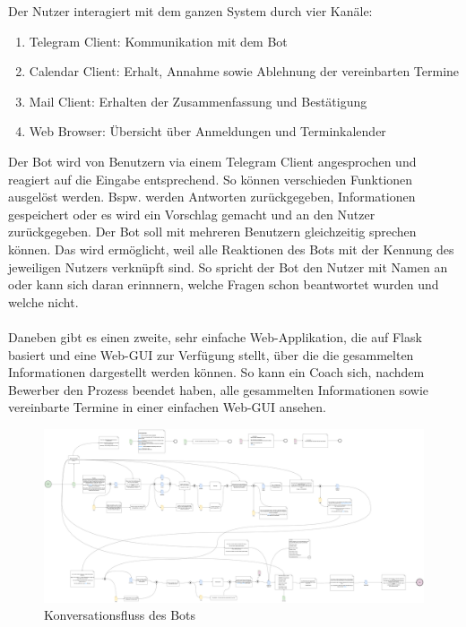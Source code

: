 Der Nutzer interagiert mit dem ganzen System durch vier Kanäle:
\begin{enumerate}
	\item Telegram Client: Kommunikation mit dem Bot
	\item Calendar Client: Erhalt, Annahme sowie Ablehnung der vereinbarten Termine
	\item Mail Client: Erhalten der Zusammenfassung und Bestätigung
	\item Web Browser: Übersicht über Anmeldungen und Terminkalender
\end{enumerate}

Der Bot wird von Benutzern via einem Telegram Client angesprochen und reagiert auf die Eingabe entsprechend. So können verschieden Funktionen ausgelöst werden. Bspw. werden Antworten zurückgegeben, Informationen gespeichert oder es wird ein Vorschlag gemacht und an den Nutzer zurückgegeben. Der Bot soll mit mehreren Benutzern gleichzeitig sprechen können. Das wird ermöglicht, weil alle Reaktionen des Bots mit der Kennung des jeweiligen Nutzers verknüpft sind. So spricht der Bot den Nutzer mit Namen an oder kann sich daran erinnnern, welche Fragen schon beantwortet wurden und welche nicht. \\ \\

Daneben gibt es einen zweite, sehr einfache Web-Applikation, die auf Flask basiert und eine Web-GUI zur Verfügung stellt, über die die gesammelten Informationen dargestellt werden können. So kann ein Coach sich, nachdem Bewerber den Prozess beendet haben, alle gesammelten Informationen sowie vereinbarte Termine in einer einfachen Web-GUI ansehen.


\begin{figure} %
	\centering
	\includegraphics[width=1.0\textwidth]{images/220213_PA28464_Conversation_Flow.png}
	\caption{Konversationsfluss des Bots}
	\label{conversationFlow}
\end{figure}

